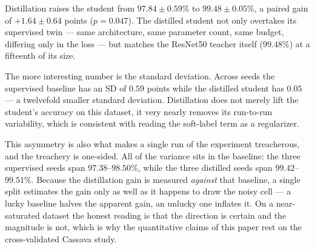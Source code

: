 \documentclass[conference]{IEEEtran}
\begin{document}
Distillation raises the student from $97.84\pm0.59\%$ to $99.48\pm0.05\%$, a
paired gain of $+1.64\pm0.64$ points ($p=0.047$). The distilled student not only
overtakes its supervised twin --- same architecture, same parameter count, same
budget, differing only in the loss --- but matches the ResNet50 teacher itself
($99.48\%$) at a fifteenth of its size.

The more interesting number is the standard deviation. Across seeds the
supervised baseline has an SD of $0.59$ points while the distilled student has
$0.05$ --- a twelvefold smaller standard deviation. Distillation does not merely
lift the student's accuracy on this dataset, it very nearly removes its
run-to-run variability, which is consistent with reading the soft-label term as a
regularizer.

This asymmetry is also what makes a single run of the experiment treacherous, and
the treachery is one-sided. All of the variance sits in the baseline: the three
supervised seeds span $97.38$--$98.50\%$, while the three distilled seeds span
$99.42$--$99.51\%$. Because the distillation gain is measured \emph{against} that
baseline, a single split estimates the gain only as well as it happens to draw
the noisy cell --- a lucky baseline halves the apparent gain, an unlucky one
inflates it. On a near-saturated dataset the honest reading is that the direction
is certain and the magnitude is not, which is why the quantitative claims of this
paper rest on the cross-validated Cassava study.

\begin{table}
  \centering
  \caption{Test results on the 38-class PlantVillage task (single 70/15/15 split,
  RTX 4070 Laptop GPU). The two MobileNetV3-Small rows are mean~$\pm$~SD over three training
  seeds; the teacher is a single run. Precision, recall, and F1 are macro-averaged.
  Note the order-of-magnitude difference in the students' standard deviations.}
  \label{tab:results}
\end{table}
\end{document}
